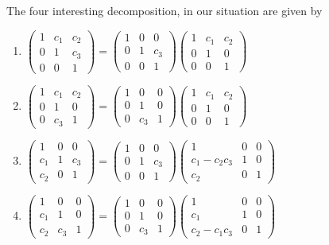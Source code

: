The four interesting decomposition, in our situation are given by
\begin{enumerate}
  \item $\begin{pmatrix} 1 & c_1 & c_2 \\0 & 1 & c_3 \\0 & 0 & 1 \end{pmatrix}
    = \begin{pmatrix} 1 & 0 & 0 \\0 & 1 & c_3 \\0 & 0 & 1 \end{pmatrix}
    \begin{pmatrix} 1 & c_1 & c_2 \\0 & 1 & 0 \\0 & 0 & 1 \end{pmatrix}$
  \item $\begin{pmatrix} 1 & c_1 & c_2 \\0 & 1 & 0 \\0 & c_3 & 1 \end{pmatrix}
    = \begin{pmatrix} 1 & 0 & 0 \\0 & 1 & 0 \\0 & c_3 & 1 \end{pmatrix}
    \begin{pmatrix} 1 & c_1 & c_2 \\0 & 1 & 0 \\0 & 0 & 1 \end{pmatrix}$
  \item $\begin{pmatrix} 1 & 0 & 0 \\c_1 & 1 & c_3 \\c_2 & 0 & 1 \end{pmatrix}
    = \begin{pmatrix} 1 & 0 & 0 \\0 & 1 & c_3 \\0 & 0 & 1 \end{pmatrix}
    \begin{pmatrix} 1 & 0 & 0 \\c_1 -c_2c_3& 1 & 0 \\c_2 & 0 & 1 \end{pmatrix}$
  \item $\begin{pmatrix} 1 & 0 & 0 \\c_1 & 1 & 0 \\c_2 & c_3 & 1 \end{pmatrix}
    = \begin{pmatrix} 1 & 0 & 0 \\0 & 1 & 0 \\0 & c_3 & 1 \end{pmatrix}
    \begin{pmatrix} 1 & 0 & 0 \\c_1 & 1 & 0 \\c_2-c_1c_3 & 0 & 1 \end{pmatrix}$
\end{enumerate}

